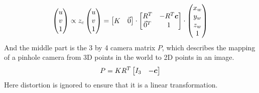 \begin{align}
\begin{pmatrix}
u\\
v\\
1
\end{pmatrix} \propto z_c\begin{pmatrix}
u\\
v\\
1
\end{pmatrix} = \begin{bmatrix}
K&\vec{0}\end{bmatrix} \cdot \begin{bmatrix}R^T & -R^T \boldsymbol{c} \\
\vec{0}^T & 1 \end{bmatrix} \cdot \begin{pmatrix}
x_w\\y_w\\z_w\\1
\end{pmatrix}
\end{align}
And the middle part is the 3 by 4 camera matrix $P$, which describes the mapping of a pinhole camera from 3D points in the world to 2D points in an image.
\begin{align}
P= KR^T \begin{bmatrix}I_{3} & -\boldsymbol{c} \end{bmatrix}
\end{align}
Here distortion is ignored to ensure that it is a linear transformation.

